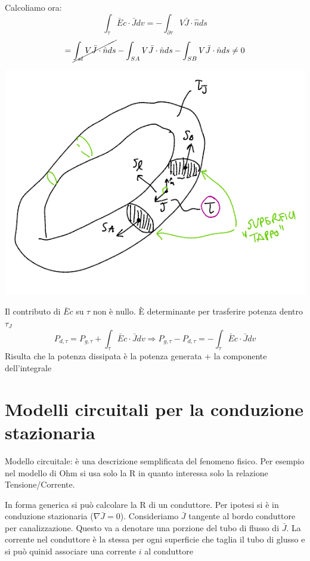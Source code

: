 Calcoliamo ora:
\[
    \int_\tau \bar Ec \cdot \bar J dv = -\int_{\partial \tau}V \bar J \cdot \hat{n}ds
\]
\[
= \cancel{\int_{sl}V \bar J \cdot \hat{n}ds} - {\int_{SA}V \bar J \cdot \hat{n}ds} - {\int_{SB}V \bar J \cdot \hat{n}ds} \not = 0
\]
\begin{center}
    \includegraphics[scale = 0.5]{immagini/image13.png}
\end{center}
Il contributo di $\bar Ec$ su $\tau$ non è nullo. È determinante per trasferire potenza dentro $\tau_J$
\[
P_{d,\tau} = P_{g,\tau} + \int_\tau\bar Ec \cdot \bar J dv \Rightarrow P_{g,\tau} - P_{d,\tau} = - \int_\tau\bar Ec \cdot \bar J dv
\]
Risulta che la potenza dissipata è la potenza generata + la componente dell'integrale

\section{Modelli circuitali per la conduzione stazionaria}
    Modello circuitale: è una descrizione semplificata del fenomeno fisico. Per esempio nel modello di Ohm si usa solo la R in quanto interessa solo la relazione Tensione/Corrente.

    In forma generica si può calcolare la R di un conduttore. Per ipotesi si è in conduzione stazionaria ($\nabla\bar J = 0$). Consideriamo $\bar J$ tangente al bordo conduttore per canalizzazione. Questo va a denotare una porzione del tubo di flusso di $\bar J$. La corrente nel conduttore è la stessa per ogni superficie che taglia il tubo di glusso e si può quinid associare una corrente $i$ al conduttore

